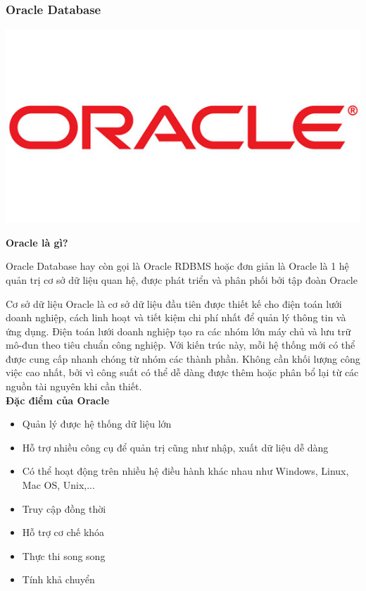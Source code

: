 \subsubsection{Oracle Database}
\begin{center}
  \captionsetup{type=figure}
  \includegraphics[scale=0.4]{image/oracle.jpg}
\end{center}


\textbf{Oracle là gì?}


Oracle Database hay còn gọi là Oracle RDBMS hoặc đơn giản là Oracle là 1 hệ quản trị cơ sở dữ liệu quan hệ, được phát triển và phân phối bởi tập đoàn Oracle

Cơ sở dữ liệu Oracle là cơ sở dữ liệu đầu tiên được thiết kế cho điện toán lưới doanh nghiệp, cách linh hoạt và tiết kiệm chi phí nhất để quản lý thông tin và ứng dụng. Điện toán lưới doanh nghiệp tạo ra các nhóm lớn máy chủ và lưu trữ mô-đun theo tiêu chuẩn công nghiệp. Với kiến trúc này, mỗi hệ thống mới có thể được cung cấp nhanh chóng từ nhóm các thành phần. Không cần khối lượng công việc cao nhất, bởi vì công suất có thể dễ dàng được thêm hoặc phân bổ lại từ các nguồn tài nguyên khi cần thiết.\\

\textbf{Đặc điểm của Oracle}
\begin{itemize}
    \item Quản lý được hệ thống dữ liệu lớn
    \item Hỗ trợ nhiều công cụ để quản trị cũng như nhập, xuất dữ liệu dễ dàng
    \item Có thể hoạt động trên nhiều hệ điều hành khác nhau như Windows, Linux, Mac OS, Unix,...
    \item Truy cập đồng thời
    \item Hỗ trợ cơ chế khóa
    \item Thực thi song song
    \item Tính khả chuyển
\end{itemize}

